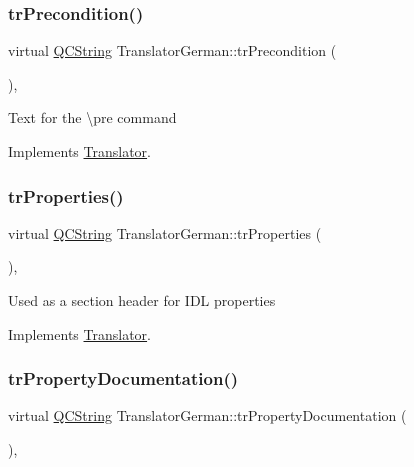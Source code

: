 \subsubsection{\texorpdfstring{trPrecondition()}{trPrecondition()}}
{\footnotesize\ttfamily virtual \mbox{\hyperlink{class_q_c_string}{Q\+C\+String}} Translator\+German\+::tr\+Precondition (\begin{DoxyParamCaption}{ }\end{DoxyParamCaption})\hspace{0.3cm}{\ttfamily [inline]}, {\ttfamily [virtual]}}

Text for the \textbackslash{}pre command 

Implements \mbox{\hyperlink{class_translator}{Translator}}.

\mbox{\label{class_translator_german_a8aaa50e6a122b5625a47c515f89f364c}} 
\subsubsection{\texorpdfstring{trProperties()}{trProperties()}}
{\footnotesize\ttfamily virtual \mbox{\hyperlink{class_q_c_string}{Q\+C\+String}} Translator\+German\+::tr\+Properties (\begin{DoxyParamCaption}{ }\end{DoxyParamCaption})\hspace{0.3cm}{\ttfamily [inline]}, {\ttfamily [virtual]}}

Used as a section header for I\+DL properties 

Implements \mbox{\hyperlink{class_translator}{Translator}}.

\mbox{\label{class_translator_german_a4fc0a8eb4da774f9ab55a1004c981e4e}} 
\subsubsection{\texorpdfstring{trPropertyDocumentation()}{trPropertyDocumentation()}}
{\footnotesize\ttfamily virtual \mbox{\hyperlink{class_q_c_string}{Q\+C\+String}} Translator\+German\+::tr\+Property\+Documentation (\begin{DoxyParamCaption}{ }\end{DoxyParamCaption})\hspace{0.3cm}{\ttfamily [inline]}, {\ttfamily [virtual]}}

